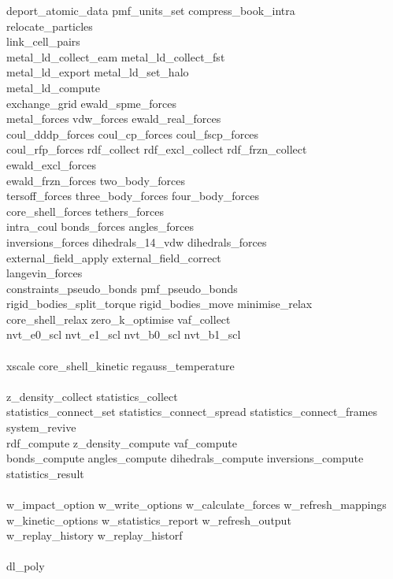 \begin{itemize}
{deport\_atomic\_data pmf\_units\_set compress\_book\_intra \\
relocate\_particles \\
link\_cell\_pairs \\
metal\_ld\_collect\_eam metal\_ld\_collect\_fst \\
metal\_ld\_export metal\_ld\_set\_halo \\
metal\_ld\_compute \\
exchange\_grid ewald\_spme\_forces \\
metal\_forces vdw\_forces ewald\_real\_forces \\
coul\_dddp\_forces coul\_cp\_forces coul\_fscp\_forces \\
coul\_rfp\_forces rdf\_collect rdf\_excl\_collect rdf\_frzn\_collect \\
ewald\_excl\_forces \\ ewald\_frzn\_forces two\_body\_forces \\
tersoff\_forces three\_body\_forces four\_body\_forces \\
core\_shell\_forces tethers\_forces \\
intra\_coul bonds\_forces angles\_forces \\
inversions\_forces dihedrals\_14\_vdw dihedrals\_forces \\
external\_field\_apply external\_field\_correct \\
langevin\_forces \\
constraints\_pseudo\_bonds pmf\_pseudo\_bonds \\
rigid\_bodies\_split\_torque rigid\_bodies\_move minimise\_relax \\
core\_shell\_relax zero\_k\_optimise vaf\_collect \\
nvt\_e0\_scl nvt\_e1\_scl nvt\_b0\_scl nvt\_b1\_scl \\
\\
xscale core\_shell\_kinetic regauss\_temperature \\
\\
z\_density\_collect statistics\_collect \\
statistics\_connect\_set statistics\_connect\_spread statistics\_connect\_frames \\
system\_revive \\
rdf\_compute z\_density\_compute vaf\_compute \\
bonds\_compute angles\_compute dihedrals\_compute inversions\_compute \\
statistics\_result \\
\\
w\_impact\_option w\_write\_options w\_calculate\_forces w\_refresh\_mappings \\
w\_kinetic\_options w\_statistics\_report w\_refresh\_output \\
w\_replay\_history w\_replay\_historf \\
\\
dl\_poly}


\end{itemize}
